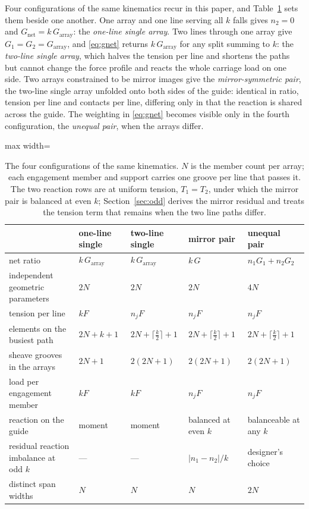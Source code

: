 \documentclass[preprint,12pt,number]{elsarticle}
\newcommand{\Gnet}{G_{\mathrm{net}}}
\newcommand{\Garr}{G_{\mathrm{array}}}
\begin{document}
Four configurations of the same kinematics recur in this paper, and Table~\ref{tab:configs} sets them beside one another. One array and one line serving all $k$ falls gives $n_2 = 0$ and $\Gnet = k\,\Garr$: the \emph{one-line single array}. Two lines through one array give $G_1 = G_2 = \Garr$, and \eqref{eq:gnet} returns $k\,\Garr$ for any split summing to $k$: the \emph{two-line single array}, which halves the tension per line and shortens the paths but cannot change the force profile and reacts the whole carriage load on one side. Two arrays constrained to be mirror images give the \emph{mirror-symmetric pair}, the two-line single array unfolded onto both sides of the guide: identical in ratio, tension per line and contacts per line, differing only in that the reaction is shared across the guide. The weighting in \eqref{eq:gnet} becomes visible only in the fourth configuration, the \emph{unequal pair}, when the arrays differ.

\begin{table}[H]
\centering
\caption{The four configurations of the same kinematics. $N$ is the member count per array; each engagement member and support carries one groove per line that passes it. The two reaction rows are at uniform tension, $T_1 = T_2$, under which the mirror pair is balanced at even $k$; Section~\ref{sec:odd} derives the mirror residual and treats the tension term that remains when the two line paths differ.}
\label{tab:configs}
\footnotesize
\begin{adjustbox}{max width=\linewidth}
\begin{tabular}{@{}l>{\centering\arraybackslash}p{2.2cm}>{\centering\arraybackslash}p{2.4cm}>{\centering\arraybackslash}p{2.4cm}>{\centering\arraybackslash}p{2.6cm}@{}}
\toprule
& one-line single & two-line single & mirror pair & unequal pair \\
\midrule
net ratio & $k\,\Garr$ & $k\,\Garr$ & $k\,G$ & $n_1 G_1 + n_2 G_2$ \\
independent geometric parameters & $2N$ & $2N$ & $2N$ & $4N$ \\
tension per line & $kF$ & $n_j F$ & $n_j F$ & $n_j F$ \\
elements on the busiest path & $2N + k + 1$ & $2N + \lceil \tfrac{k}{2}\rceil + 1$ & $2N + \lceil \tfrac{k}{2}\rceil + 1$ & $2N + \lceil \tfrac{k}{2}\rceil + 1$ \\
sheave grooves in the arrays & $2N+1$ & $2(2N+1)$ & $2(2N+1)$ & $2(2N+1)$ \\
load per engagement member & $kF$ & $kF$ & $n_j F$ & $n_j F$ \\
reaction on the guide & moment & moment & balanced at even $k$ & balanceable at any $k$ \\
residual reaction imbalance at odd $k$ & --- & --- & $|n_1 - n_2|/k$ & designer's choice \\
distinct span widths & $N$ & $N$ & $N$ & $2N$ \\
\bottomrule
\end{tabular}
\end{adjustbox}
\end{table}
\end{document}
